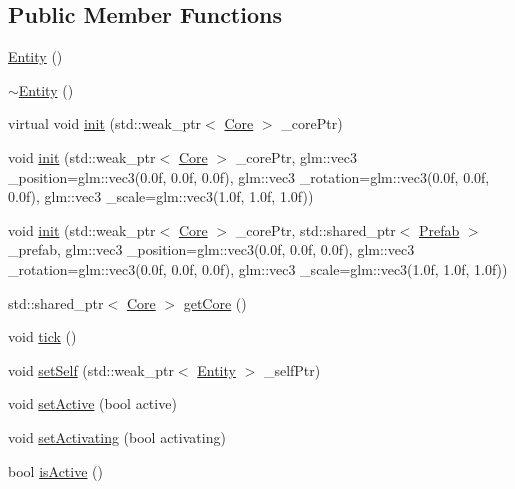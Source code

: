 \subsection*{Public Member Functions}
\begin{DoxyCompactItemize}
\item 
\hyperlink{classfrontier_1_1_entity_a1d3f7c7fd0e6f01fa609e06fe76c8791}{Entity} ()
\item 
\hyperlink{classfrontier_1_1_entity_a56e4bc3a132b605bd8432259d8209808}{$\sim$\+Entity} ()
\item 
virtual void \hyperlink{classfrontier_1_1_entity_a9a37ec4188e73c190471a5de2db21c77}{init} (std\+::weak\+\_\+ptr$<$ \hyperlink{classfrontier_1_1_core}{Core} $>$ \+\_\+core\+Ptr)
\item 
void \hyperlink{classfrontier_1_1_entity_a8dd740cd4134ddab40663239527959e1}{init} (std\+::weak\+\_\+ptr$<$ \hyperlink{classfrontier_1_1_core}{Core} $>$ \+\_\+core\+Ptr, glm\+::vec3 \+\_\+position=glm\+::vec3(0.\+0f, 0.\+0f, 0.\+0f), glm\+::vec3 \+\_\+rotation=glm\+::vec3(0.\+0f, 0.\+0f, 0.\+0f), glm\+::vec3 \+\_\+scale=glm\+::vec3(1.\+0f, 1.\+0f, 1.\+0f))
\item 
void \hyperlink{classfrontier_1_1_entity_aba15243f8a661c4c9248e405fd869894}{init} (std\+::weak\+\_\+ptr$<$ \hyperlink{classfrontier_1_1_core}{Core} $>$ \+\_\+core\+Ptr, std\+::shared\+\_\+ptr$<$ \hyperlink{classfrontier_1_1_prefab}{Prefab} $>$ \+\_\+prefab, glm\+::vec3 \+\_\+position=glm\+::vec3(0.\+0f, 0.\+0f, 0.\+0f), glm\+::vec3 \+\_\+rotation=glm\+::vec3(0.\+0f, 0.\+0f, 0.\+0f), glm\+::vec3 \+\_\+scale=glm\+::vec3(1.\+0f, 1.\+0f, 1.\+0f))
\item 
std\+::shared\+\_\+ptr$<$ \hyperlink{classfrontier_1_1_core}{Core} $>$ \hyperlink{classfrontier_1_1_entity_a16f971a959ad628436e92368c342e2a2}{get\+Core} ()
\item 
void \hyperlink{classfrontier_1_1_entity_a99e123fc3c5fae5de4451fa5ea30d998}{tick} ()
\item 
void \hyperlink{classfrontier_1_1_entity_a35704148ee2160386445e9aaed3cbc78}{set\+Self} (std\+::weak\+\_\+ptr$<$ \hyperlink{classfrontier_1_1_entity}{Entity} $>$ \+\_\+self\+Ptr)
\item 
void \hyperlink{classfrontier_1_1_entity_a14b8bf3af26752cdd0240a9f48d411e1}{set\+Active} (bool active)
\item 
void \hyperlink{classfrontier_1_1_entity_a3a5eba11cf4dacc3de15ef460ee9d7de}{set\+Activating} (bool activating)
\item 
bool \hyperlink{classfrontier_1_1_entity_a1b19a21c357e557a3c12b6257d21ff09}{is\+Active} ()

\end{DoxyCompactItemize}

